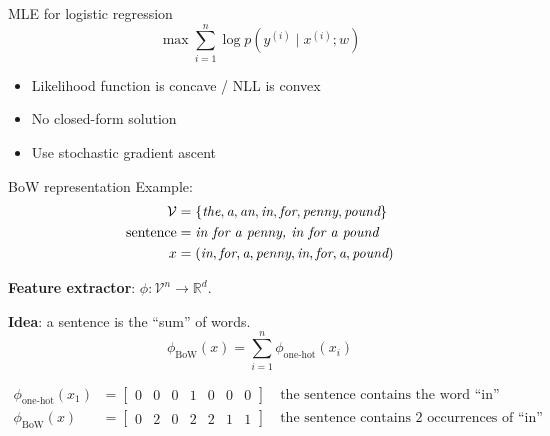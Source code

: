\documentclass[usenames,dvipsnames,notes,11pt,aspectratio=169]{beamer}
\newcommand{\pdfnote}[1]{}
\newcommand\w[1]{\textit{#1}}
\begin{document}
\begin{frame}
    {MLE for logistic regression}
    $$
    \max \sum_{i=1}^n \log p(y^{(i)}\mid x^{(i)}; w) 
    $$
    \begin{itemize}
        \item Likelihood function is concave / NLL is convex
            \pause
        \item No closed-form solution 
        \item Use stochastic gradient ascent 
    \end{itemize}
    \pdfnote{LR is probabilistic, so we can still do MLE.}
    \pdfnote{Is there a closed form solution?}
\end{frame}

\begin{frame}
    {BoW representation}
    Example:
    \begin{align*}
        \mathcal{V} &= \pc{\w{the}, \w{a}, \w{an}, \w{in}, \w{for}, \w{penny}, \w{pound}}\\
        \text{sentence} &= \w{in for a penny, in for a pound} \\
        x &= \p{\w{in}, \w{for}, \w{a}, \w{penny}, \w{in}, \w{for}, \w{a}, \w{pound}}
    \end{align*}

    \textbf{Feature extractor}: $\phi\colon \mathcal{V}^n \rightarrow \mathbb{R}^d$.
    \pause

    \textbf{Idea}: a sentence is the ``sum'' of words.
    $$
    \phi_{\text{BoW}}(x) = \sum_{i=1}^n \phi_{\text{one-hot}}(x_i)
    $$
    \vspace{-1em}

    \begin{align*}
        \phi_{\text{one-hot}}(x_1) &= \begin{bmatrix} 0 & 0 & 0 & 1 & 0 & 0 & 0 \end{bmatrix}
        \quad \text{the sentence contains the word ``in''}\\
        \phi_{\text{BoW}}(x)  &= \begin{bmatrix} 0 & 2 & 0 & 2 & 2 & 1 & 1 \end{bmatrix}
        \quad \text{the sentence contains 2 occurrences of ``in''}\\
    \end{align*}
\end{frame}
\end{document}
